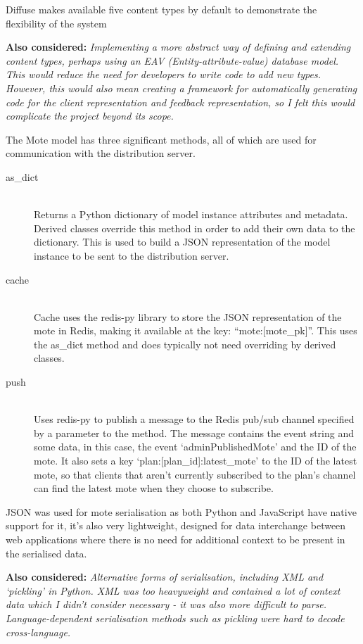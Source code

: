 \documentclass[a4papert,11pt,notitlepage]{ltxdoc}
\begin{document}
Diffuse makes available five content types by default to demonstrate the flexibility of the system

\textbf{Also considered:} \emph{Implementing a more abstract way of defining and extending content types, perhaps using an EAV (Entity-attribute-value) database model. This would reduce the need for developers to write code to add new types. However, this would also mean creating a framework for automatically generating code for the client representation and feedback representation, so I felt this would complicate the project beyond its scope.}

The Mote model has three significant methods, all of which are used for communication with the distribution server.
\begin{description}
\item[as\_dict] \hfill \\
Returns a Python dictionary of model instance attributes and metadata. Derived classes override this method in order to add their own data to the dictionary. This is used to build a JSON representation of the model instance to be sent to the distribution server.
\item[cache] \hfill \\
Cache uses the redis-py\cite{redispy:web} library to store the JSON representation of the mote in Redis, making it available at the key: ``mote:{[}mote\_pk{]}''. This uses the as\_dict method and does typically not need overriding by derived classes.
\item[push] \hfill \\
Uses redis-py to publish a message to the Redis pub/sub channel specified by a parameter to the method. The message contains the event string and some data, in this case, the event `adminPublishedMote' and the ID of the mote. It also sets a key `plan:{[}plan\_id{]}:latest\_mote' to the ID of the latest mote, so that clients that aren't currently subscribed to the plan's channel can find the latest mote when they choose to subscribe.
\end{description}

JSON was used for mote serialisation as both Python and JavaScript have native support for it, it's also very lightweight, designed for data interchange between web applications where there is no need for additional context to be present in the serialised data.

\textbf{Also considered:} \emph{Alternative forms of serialisation, including XML and `pickling' in Python. XML was too heavyweight and contained a lot of context data which I didn't consider necessary - it was also more difficult to parse. Language-dependent serialisation methods such as pickling were hard to decode cross-language.}
\end{document}
